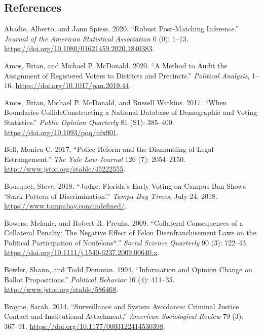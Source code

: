 \documentclass[
  12pt,
]{article}
\newlength{\cslhangindent}
\newenvironment{cslreferences}%
  {\setlength{\parindent}{0pt}%
  \everypar{\setlength{\hangindent}{\cslhangindent}}\ignorespaces}%
  {\par}
\begin{document}
\newpage

\hypertarget{references}{%
\subsection*{References}\label{references}}

\hypertarget{refs}{}
\begin{cslreferences}
\leavevmode\hypertarget{ref-Abadie2020}{}%
Abadie, Alberto, and Jann Spiess. 2020. ``Robust Post-Matching Inference.'' \emph{Journal of the American Statistical Association} 0 (0): 1--13. \url{https://doi.org/10.1080/01621459.2020.1840383}.

\leavevmode\hypertarget{ref-Amos2020}{}%
Amos, Brian, and Michael P. McDonald. 2020. ``A Method to Audit the Assignment of Registered Voters to Districts and Precincts.'' \emph{Political Analysis}, 1--16. \url{https://doi.org/10.1017/pan.2019.44}.

\leavevmode\hypertarget{ref-Amos2017}{}%
Amos, Brian, Michael P. McDonald, and Russell Watkins. 2017. ``When Boundaries CollideConstructing a National Database of Demographic and Voting Statistics.'' \emph{Public Opinion Quarterly} 81 (S1): 385--400. \url{https://doi.org/10.1093/poq/nfx001}.

\leavevmode\hypertarget{ref-Bell2017}{}%
Bell, Monica C. 2017. ``Police Reform and the Dismantling of Legal Estrangement.'' \emph{The Yale Law Journal} 126 (7): 2054--2150. \url{http://www.jstor.org/stable/45222555}.

\leavevmode\hypertarget{ref-Bousquet2018a}{}%
Bousquet, Steve. 2018. ``Judge: Florida's Early Voting-on-Campus Ban Shows `Stark Pattern of Discrimination'.'' \emph{Tampa Bay Times}, July 24, 2018. \url{https://www.tampabay.comundefined/}.

\leavevmode\hypertarget{ref-Bowers2009}{}%
Bowers, Melanie, and Robert R. Preuhs. 2009. ``Collateral Consequences of a Collateral Penalty: The Negative Effect of Felon Disenfranchisement Laws on the Political Participation of Nonfelons*.'' \emph{Social Science Quarterly} 90 (3): 722--43. \url{https://doi.org/10.1111/j.1540-6237.2009.00640.x}.

\leavevmode\hypertarget{ref-Bowler1994}{}%
Bowler, Shaun, and Todd Donovan. 1994. ``Information and Opinion Change on Ballot Propositions.'' \emph{Political Behavior} 16 (4): 411--35. \url{http://www.jstor.org/stable/586468}.

\leavevmode\hypertarget{ref-Brayne2014}{}%
Brayne, Sarah. 2014. ``Surveillance and System Avoidance: Criminal Justice Contact and Institutional Attachment.'' \emph{American Sociological Review} 79 (3): 367--91. \url{https://doi.org/10.1177/0003122414530398}.


\end{cslreferences}
\end{document}
